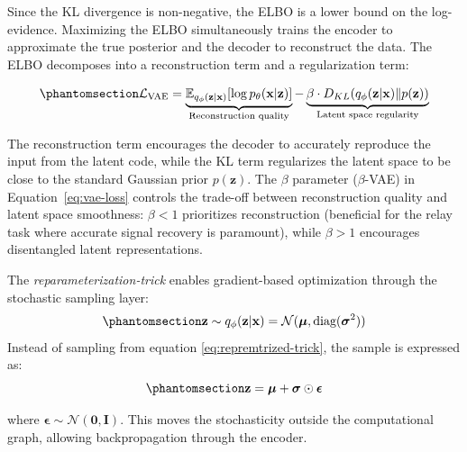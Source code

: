 Since the KL divergence is non-negative, the ELBO is a lower bound on the log-evidence. Maximizing the ELBO simultaneously trains the encoder to approximate the true posterior and the decoder to reconstruct the data. The ELBO decomposes into a reconstruction term and a regularization term:

\begin{equation}\protect\phantomsection\label{eq:vae-loss}{\mathcal{L}_{\text{VAE}} = \underbrace{\mathbb{E}_{q_\phi(\mathbf{z}|\mathbf{x})}[\log p_\theta(\mathbf{x}|\mathbf{z})]}_{\text{Reconstruction quality}} - \underbrace{\beta \cdot D_{KL}(q_\phi(\mathbf{z}|\mathbf{x}) \| p(\mathbf{z}))}_{\text{Latent space regularity}}
}\end{equation}

The reconstruction term encourages the decoder to accurately reproduce the input from the latent code, while the KL term regularizes the latent space to be close to the standard Gaussian prior \(p(\mathbf{z})\). The \(\beta\) parameter (\(\beta\)-VAE) \cite{Higgins2017betaVAE} in Equation~\ref{eq:vae-loss} controls the trade-off between reconstruction quality and latent space smoothness: \(\beta < 1\) prioritizes reconstruction (beneficial for the relay task where accurate signal recovery is paramount), while \(\beta > 1\) encourages disentangled latent representations.

The \emph{reparameterization-trick} enables gradient-based optimization through the stochastic sampling layer:
\begin{equation}\protect\phantomsection\label{eq:repremtrized-trick}
\mathbf{z} \sim q_\phi(\mathbf{z} | \mathbf{x}) = \mathcal{N}(\boldsymbol{\mu}, \text{diag}(\boldsymbol{\sigma}^2))
\end{equation}
Instead of sampling from equation \ref{eq:repremtrized-trick}, the sample is expressed as:
\begin{equation}\protect\phantomsection\label{eq:repremtrized-trick-resample}
\mathbf{z} = \boldsymbol{\mu} + \boldsymbol{\sigma} \odot \boldsymbol{\epsilon}
\end{equation}

where \(\boldsymbol{\epsilon} \sim \mathcal{N}(\mathbf{0}, \mathbf{I})\).
This moves the stochasticity outside the computational graph, allowing backpropagation through the encoder.

